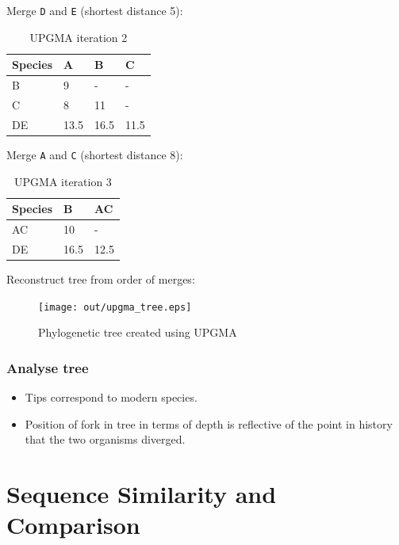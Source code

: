 \documentclass[a4paper]{article}
\begin{document}
Merge \texttt{D} and \texttt{E} (shortest distance 5):

\begin{table}[h!]
  \centering
  \begin{tabular}{@{}llll@{}}
    \toprule
    Species & A    & B    & C    \\
    \midrule
    B       & 9    & -    & -    \\
    C       & 8    & 11   & -    \\
    DE      & 13.5 & 16.5 & 11.5 \\
    \bottomrule
  \end{tabular}
  \caption{UPGMA iteration 2}
  \label{tab:upgma_2}
\end{table}
\FloatBarrier

Merge \texttt{A} and \texttt{C} (shortest distance 8):

\begin{table}[h!]
  \centering
  \begin{tabular}{@{}lll@{}}
    \toprule
    Species & B    & AC   \\
    \midrule
    AC      & 10   & -    \\
    DE      & 16.5 & 12.5 \\
    \bottomrule
  \end{tabular}
  \caption{UPGMA iteration 3}
  \label{tab:upgma_3}
\end{table}
\FloatBarrier

Reconstruct tree from order of merges:

\begin{figure}[h!]
  \centering
  \texttt{[image: out/upgma\_tree.eps]}
  \caption{Phylogenetic tree created using UPGMA}
  \label{fig:upgma_tree}
\end{figure}
\FloatBarrier

\subsubsection{Analyse tree}

\begin{itemize}
  \item
    Tips correspond to modern species.

  \item
    Position of fork in tree in terms of depth is reflective of the point in
    history that the two organisms diverged.
\end{itemize}

\section{Sequence Similarity and Comparison}
\end{document}
